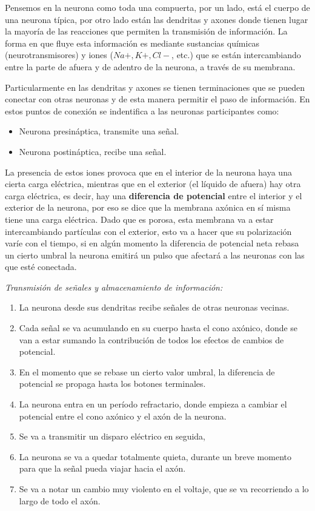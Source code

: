  Pensemos en la neurona como toda una compuerta, por un lado, está el cuerpo de una neurona típica, por otro lado están las dendritas y axones donde tienen lugar la mayoría de las reacciones que permiten la transmisión de información.  La forma en que fluye esta información es mediante sustancias químicas (neurotransmisores) y iones ($Na+, K+, Cl-$, etc.) que se están intercambiando entre la parte de afuera y de adentro de la neurona, a través de su membrana.
 
 Particularmente en las dendritas y axones se tienen terminaciones que se pueden conectar con otras neuronas y de esta manera permitir el paso de información. En estos puntos de conexión se indentifica a las neuronas participantes como:
 
 \begin{itemize}
  \item Neurona presináptica, transmite una señal.
  \item Neurona postináptica, recibe una señal.
 \end{itemize}  
 
La presencia de estos iones provoca que en el interior de la neurona haya una cierta carga eléctrica, mientras que en el exterior (el líquido de afuera) hay otra carga eléctrica, es decir, hay una \textbf{diferencia de potencial} entre el interior y el exterior de la neurona, por eso se dice que la membrana axónica en sí misma tiene una carga eléctrica. Dado que es porosa, esta membrana  va a estar intercambiando partículas con el exterior, esto va a hacer que su polarización varíe con el tiempo, si en algún momento la diferencia de potencial neta rebasa un cierto umbral la neurona emitirá un pulso que afectará a las neuronas con las que esté conectada.




\emph{Transmisión de señales y almacenamiento de información:}


\begin{enumerate}
 \item La neurona desde sus dendritas recibe señales de otras neuronas vecinas.
 \item Cada señal se va acumulando en su cuerpo hasta el cono axónico, donde se van a estar sumando la contribución de todos los efectos de cambios de potencial.
 \item En el momento que se rebase un cierto valor umbral, la diferencia de potencial se propaga hasta los botones terminales.
 \item La neurona entra en un período refractario, donde empieza a cambiar el potencial entre el cono axónico y el axón de la neurona.
 \item Se va a transmitir un disparo eléctrico en seguida,
 \item La neurona se va a quedar totalmente quieta, durante un breve momento para que la señal pueda viajar hacia el axón.
 \item Se va a notar un cambio muy violento en el voltaje, que se va recorriendo a lo largo de todo el axón. 
\end{enumerate}


